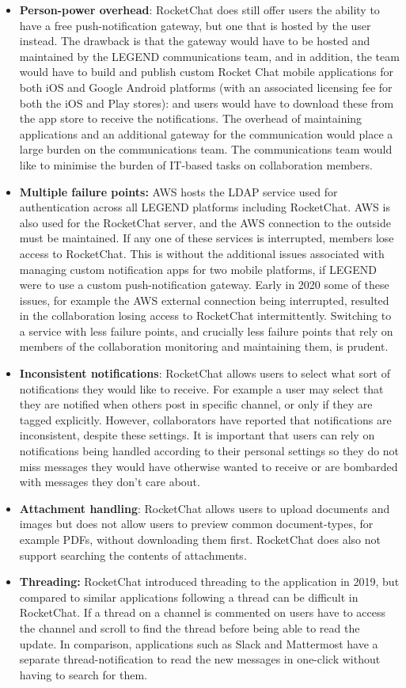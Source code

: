 \documentclass[11pt,letterpaper]{article}
\begin{document}
\begin{itemize}
\item \textbf{Person-power overhead}: RocketChat does still offer users the ability to have a free push-notification gateway, but one that is hosted by the user instead. The drawback is that the gateway would have to be hosted and maintained by the LEGEND communications team, and in addition, the team would have to build and publish custom Rocket Chat mobile applications for both iOS and Google Android platforms (with an associated licensing fee for both the iOS and Play stores): and users would have to download these from the app store to receive the notifications. The overhead of maintaining applications and an additional gateway for the communication would place a large burden on the communications team. The communications team would like to minimise the burden of IT-based tasks on collaboration members. 
\item \textbf{Multiple failure points:} AWS hosts the LDAP service used for authentication across all LEGEND platforms including RocketChat. AWS is also used for the RocketChat server, and the AWS connection to the outside must be maintained. If any one of these services is interrupted, members lose access to RocketChat. This is without the additional issues associated with managing custom notification apps for two mobile platforms, if LEGEND were to use a custom push-notification gateway. Early in 2020 some of these issues, for example the AWS external connection being interrupted, resulted in the collaboration losing access to RocketChat intermittently.  Switching to a service with less failure points, and crucially less failure points that rely on members of the collaboration monitoring and maintaining them, is prudent. 
\item \textbf{Inconsistent notifications}: RocketChat allows users to select what sort of notifications they would like to receive. For example a user may select that they are notified when others post in specific channel, or only if they are tagged explicitly. However, collaborators have reported that notifications are inconsistent, despite these settings. It is important that users can rely on notifications being handled according to their personal settings so they do not miss messages they would have otherwise wanted to receive or are bombarded with messages they don't care about.
\item \textbf{Attachment handling}: RocketChat allows users to upload documents and images but does not allow users to preview common document-types, for example PDFs, without downloading them first. RocketChat does also not support searching the contents of attachments. 
\item \textbf{Threading:} RocketChat introduced threading to the application in 2019, but compared to similar applications following a thread can be difficult in RocketChat. If a thread on a channel is commented on users have to access the channel and scroll to find the thread before being able to read the update. In comparison, applications such as Slack and Mattermost have a separate thread-notification to read the new messages in one-click without having to search for them.  
\end{itemize}
\end{document}
